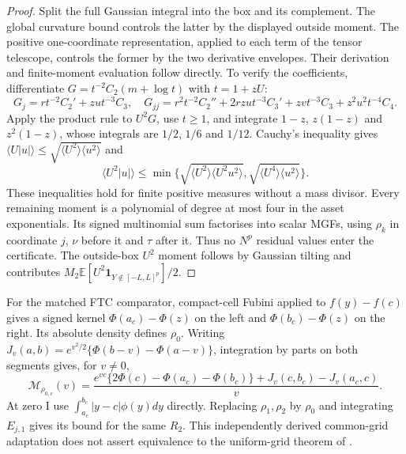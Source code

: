 \documentclass[11pt]{article}
\begin{document}
\begin{proof}
Split the full Gaussian integral into the box and its complement.
The global curvature bound controls the latter by the displayed outside
moment. The positive one-coordinate representation, applied to each term
of the tensor telescope, controls the former by the two derivative
envelopes. Their derivation and finite-moment evaluation follow directly.
To verify the coefficients, differentiate
$G=t^{-2}C_2(m+\log t)$ with $t=1+zU$:
\begin{equation}
 G_j=rt^{-2}C_2'+zu t^{-3}C_3,
\quad G_{jj}=r^2t^{-2}C_2''+2rzu t^{-3}C_3'
                         +zv t^{-3}C_3+z^2u^2t^{-4}C_4.
\end{equation}
Apply the product rule to $U^2G$, use $t\geq1$, and integrate
$1-z$, $z(1-z)$ and $z^2(1-z)$, whose integrals are $1/2$, $1/6$
and $1/12$. Cauchy's inequality gives
$\langle U|u|\rangle\leq\sqrt{\langle U^2\rangle\langle u^2\rangle}$
and
\begin{equation}
 \langle U^2|u|\rangle\leq
 \min\{\sqrt{\langle U^2\rangle\langle U^2u^2\rangle},
          \sqrt{\langle U^4\rangle\langle u^2\rangle}\}.
\end{equation}
These inequalities hold for finite positive measures without a mass
divisor. Every remaining moment is a polynomial of degree at most four
in the asset exponentials. Its signed multinomial sum factorises into
scalar MGFs, using $\rho_k$ in coordinate $j$, $\nu$ before it and
$\tau$ after it. Thus no $N^p$ residual values enter the certificate.
The outside-box $U^2$ moment follows by Gaussian tilting and contributes
$M_2\mathbb E[U^2\mathbf1_{Y\notin[-L,L]^p}]/2$.

\end{proof}

For the matched FTC comparator, compact-cell Fubini applied to
$f(y)-f(c)$ gives a signed kernel $\Phi(a_c)-\Phi(z)$ on the left and
$\Phi(b_c)-\Phi(z)$ on the right. Its absolute density defines $\rho_0$.
Writing $J_v(a,b)=e^{v^2/2}\{\Phi(b-v)-\Phi(a-v)\}$, integration by parts
on both segments gives, for $v\ne0$,
\begin{equation}
 \mathcal M_{\rho_{0,c}}(v)=
 \frac{e^{vc}\{2\Phi(c)-\Phi(a_c)-\Phi(b_c)\}
             +J_v(c,b_c)-J_v(a_c,c)}{v}.
\end{equation}
At zero I use $\int_{a_c}^{b_c}|y-c|\phi(y)dy$ directly. Replacing
$\rho_1,\rho_2$ by $\rho_0$ and integrating $E_{j,1}$ gives its bound
for the same $R_2$. This independently derived common-grid adaptation
does not assert equivalence to the uniform-grid theorem of
\citet{herman2026}.
\end{document}
